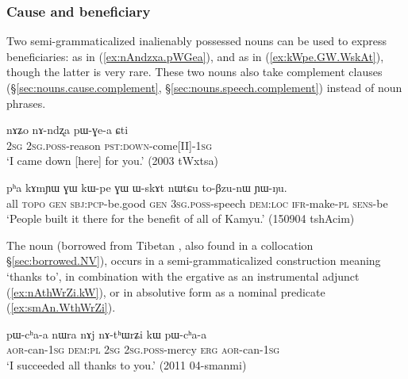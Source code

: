 \subsubsection{Cause and beneficiary} \label{sec:IPN.cause}
 
Two semi-grammaticalized inalienably possessed nouns can be used to express beneficiaries:  as in (\ref{ex:nAndzxa.pWGea}), and  as in (\ref{ex:kWpe.GW.WskAt}), though the latter is very rare. These two nouns also take complement clauses (§\ref{sec:nouns.cause.complement}, §\ref{sec:nouns.speech.complement}) instead of noun phrases.

\begin{exe}
\ex \label{ex:nAndzxa.pWGea}
\gll nɤʑo nɤ-ndʐa pɯ-ɣe-a ɕti \\
\textsc{2sg} \textsc{2sg}.\textsc{poss}-reason \textsc{pst}:\textsc{down}-come[II]-\textsc{1sg} \\
\glt `I came down [here] for you.' (2003 tWxtsa)
\end{exe}

\begin{exe}
\ex \label{ex:kWpe.GW.WskAt}
\gll pʰa kɤmɲɯ ɣɯ kɯ-pe ɣɯ ɯ-skɤt nɯtɕu to-βzu-nɯ ɲɯ-ŋu. \\
all  \textsc{topo} \textsc{gen} \textsc{sbj}:\textsc{pcp}-be.good \textsc{gen} \textsc{3sg}.\textsc{poss}-speech \textsc{dem}:\textsc{loc} \textsc{ifr}-make-\textsc{pl} \textsc{sens}-be \\
\glt `People built it there for the benefit of all of Kamyu.' (150904 tshAcim)
\end{exe}

The noun  (borrowed from Tibetan , also found in a collocation §\ref{sec:borrowed.NV}), occurs in a semi-grammaticalized construction meaning `thanks to', in combination with the ergative  as an instrumental adjunct (\ref{ex:nAthWrZi.kW}), or in absolutive form as a nominal predicate (\ref{ex:smAn.WthWrZi}).

  \begin{exe}
\ex \label{ex:nAthWrZi.kW}
\gll pɯ-cʰa-a nɯra nɤj nɤ-tʰɯrʑi kɯ pɯ-cʰa-a \\
\textsc{aor}-can-\textsc{1sg} \textsc{dem}:\textsc{pl} \textsc{2sg} \textsc{2sg}.\textsc{poss}-mercy \textsc{erg} \textsc{aor}-can-\textsc{1sg} \\
\glt `I succeeded all thanks to you.' (2011 04-smanmi)
  \end{exe}

